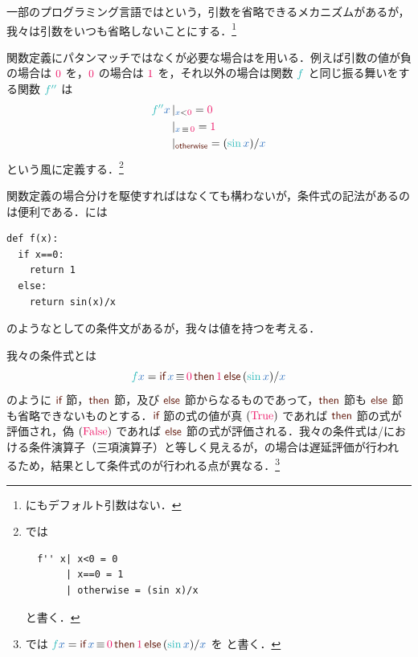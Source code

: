\documentclass[a5paper,twoside,fleqn,draft]{jsbook}
\begin{document}
一部のプログラミング言語ではという，引数を省略できるメカニズムがあるが，我々は引数をいつも省略しないことにする．\footnote{\haskell にもデフォルト引数はない．}

\separator

関数定義にパタンマッチではなくが必要な場合はを用いる．例えば引数の値が負の場合は $\hConstant{0}$ を，$\hConstant{0}$ の場合は $\hConstant{1}$ を，それ以外の場合は関数 $\hFunc{f}$ と同じ振る舞いをする関数 $\hFunc{f''}$ は
\begin{equation}
  \begin{aligned}
    \hFunc{f''}\hVar{x}&\hGuard{\hVar{x}<\hConstant{0}}=\hConstant{0}\\
    &\hGuard{\hVar{x}\hIfEq\hConstant{0}}=\hConstant{1}\\
    &\hGuard{\hOtherwise}=(\hSin\hVar{x})/\hVar{x}
  \end{aligned}
\end{equation}
という風に定義する．\footnote{\haskell では
\begin{verbatim}
  f'' x| x<0 = 0
       | x==0 = 1
       | otherwise = (sin x)/x
\end{verbatim}
と書く．}

\separator

関数定義の場合分けを駆使すればはなくても構わないが，条件式の記法があるのは便利である．\python には
\begin{pythoncode}
\begin{verbatim}
def f(x):
  if x==0:
    return 1
  else:
    return sin(x)/x
\end{verbatim}
\end{pythoncode}
のようなとしての条件文があるが，我々は値を持つを考える．

我々の条件式とは
\begin{equation}
  \hFunc{f}\hVar{x}
  =\hIfSyntax{\hVar{x}\hIfEq\hConstant{0}}{\hConstant{1}}{{}(\hSin\hVar{x})/\hVar{x}}
\end{equation}
のように $\hIf$ 節，$\hThen$ 節，及び $\hElse$ 節からなるものであって，$\hThen$ 節も $\hElse$ 節も省略できないものとする．$\hIf$ 節の式の値が真 $(\hTrue)$ であれば $\mThen$ 節の式が評価され，偽 $(\hFalse)$ であれば $\hElse$ 節の式が評価される．我々の条件式は\clang/\cxx における条件演算子（三項演算子）と等しく見えるが，\haskell の場合は遅延評価が行われ
るため，結果として条件式のが行われる点が異なる．\footnote{\haskell では $\hFunc{f}\hVar{x}=\hIfSyntax{\hVar{x}\hIfEq\hConstant{0}}{\hConstant{1}}{{}(\hSin\hVar{x})/\hVar{x}}$ を  と書く．}
\end{document}
